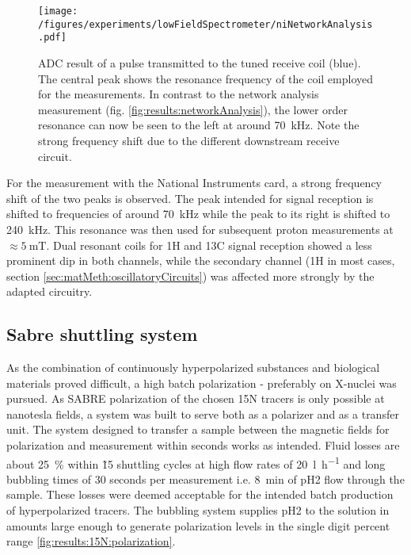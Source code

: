             \begin{figure}
                \texttt{[image: /figures/experiments/lowFieldSpectrometer/niNetworkAnalysis.pdf]}
                \caption[Network analysis NI card]{ADC result of a pulse transmitted to the tuned receive coil (blue). The central peak shows the resonance frequency of the coil employed for the measurements. In contrast to the network analysis measurement (fig. \ref{fig:results:networkAnalysis}), the lower  order resonance can now be seen to the left at around \SI{70}{\kilo\hertz}. Note the strong frequency shift due to the different downstream receive circuit.}
                \label{fig:results:niNetworkAnalysis}
            \end{figure}
            For the measurement with the National Instruments card, a strong frequency shift of the two peaks is observed. The peak intended for signal reception is shifted to frequencies of around \SI{70}{\kilo\hertz} while the peak to its right is shifted to \SI{240}{\kilo\hertz}. This resonance was then used for subsequent proton measurements at $\approx\SI{5}{\milli\tesla}$. Dual resonant coils for 1H and 13C signal reception showed a less prominent dip in both channels, while the secondary channel (1H in most cases, section \ref{sec:matMeth:oscillatoryCircuits}) was affected more strongly by the adapted circuitry.
    \subsection{Sabre shuttling system}
    As the combination of continuously hyperpolarized substances and biological materials proved difficult, a high batch polarization - preferably on X-nuclei was pursued. As SABRE polarization of the chosen 15N tracers is only possible at nanotesla fields, a system was built to serve both as a polarizer and as a transfer unit. The system designed to transfer a sample between the magnetic fields for polarization and measurement within seconds works as intended. Fluid losses are about \SI{25}{\percent} within \~15 shuttling cycles at high flow rates of \SI{20}{\litre \per\hour} and long bubbling times of 30 seconds per measurement i.e. \SI{8}{\minute} of pH2 flow through the sample. These losses were deemed acceptable for the intended batch production of hyperpolarized tracers. The bubbling system supplies pH2 to the solution in amounts large enough to generate polarization levels in the single digit percent range \ref{fig:results:15N:polarization}.
